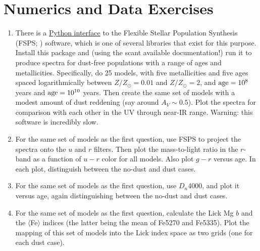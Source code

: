 %

\section{Numerics and Data Exercises}

\begin{enumerate}
\item There is
a \href{https://python-fsps.readthedocs.io/en/latest/installation/}{Python
interface} to the Flexible Stellar Population Synthesis
(FSPS; \citealt{conroy09a}) software, which is one of several
libraries that exist for this purpose. Install this package and (using
the scant available documentation!) run it to produce spectra for
dust-free populations with a range of ages and
metallicities. Specifically, do 25 models, with five metallicities and
five ages spaced logarithmically between $Z/Z_\odot = 0.01$ and
$Z/Z_\odot = 2$, and ${\rm age} = 10^8$ years and ${\rm age} =
10^{10}$ years. Then create the same set of models with a modest
amount of dust reddening (say around $A_V \sim 0.5$). Plot the spectra
for comparison with each other in the UV through near-IR
range. Warning: this software is incredibly slow.
\item For the same set of models as the first question, use FSPS to
project the spectra onto the $u$ and $r$ filters. Then plot the
mass-to-light ratio in the $r$-band as a function of $u-r$ color for
all models.  Also plot $g-r$ versus age. In each plot, distinguish
between the no-dust and dust cases.
\item For the same set of models as the first question, use $D_n$4000,
and plot it versus age, again distinguishing between the no-dust and
dust cases.
\item For the same set of models as the first question, calculate
the Lick Mg $b$ and the $\langle$Fe$\rangle$ indices (the latter being
the mean of Fe5270 and Fe5335). Plot the mapping of this set
of models into the Lick index space as two grids (one for each dust
case). 
\end{enumerate}


  
